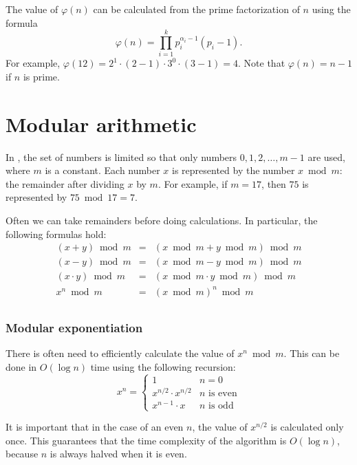 The value of $\varphi(n)$ can be calculated
from the prime factorization of $n$
using the formula
\[ \varphi(n) = \prod_{i=1}^k p_i^{\alpha_i-1}(p_i-1). \]
For example, $\varphi(12)=2^1 \cdot (2-1) \cdot 3^0 \cdot (3-1)=4$.
Note that $\varphi(n)=n-1$ if $n$ is prime.

\section{Modular arithmetic}


In ,
the set of numbers is limited so
that only numbers $0,1,2,\ldots,m-1$ are used,
where $m$ is a constant.
Each number $x$ is
represented by the number $x \bmod m$:
the remainder after dividing $x$ by $m$.
For example, if $m=17$, then $75$
is represented by $75 \bmod 17 = 7$.

Often we can take remainders before doing
calculations.
In particular, the following formulas hold:
\[
\begin{array}{rcl}
(x+y) \bmod m & = & (x \bmod m + y \bmod m) \bmod m \\
(x-y) \bmod m & = & (x \bmod m - y \bmod m) \bmod m \\
(x \cdot y) \bmod m & = & (x \bmod m \cdot y \bmod m) \bmod m \\
x^n \bmod m & = & (x \bmod m)^n \bmod m \\
\end{array}
\]

\subsubsection{Modular exponentiation}

There is often need to efficiently calculate
the value of $x^n \bmod m$.
This can be done in $O(\log n)$ time
using the following recursion:
\begin{equation*}
    x^n = \begin{cases}
               1        & n = 0\\
               x^{n/2} \cdot x^{n/2} & \text{$n$ is even}\\
               x^{n-1} \cdot x & \text{$n$ is odd}
           \end{cases}
\end{equation*}

It is important that in the case of an even $n$,
the value of $x^{n/2}$ is calculated only once.
This guarantees that the time complexity of the
algorithm is $O(\log n)$, because $n$ is always halved
when it is even.

